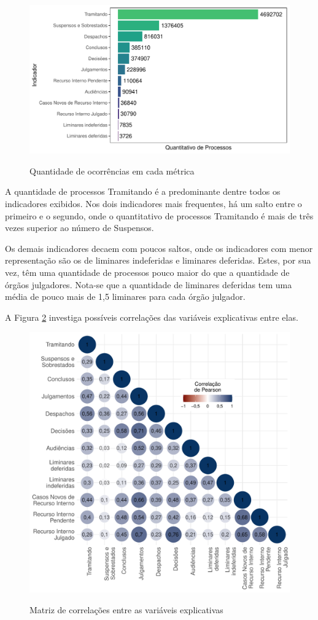 \begin{figure}[H]
    \centering
    \caption{Quantidade de ocorrências em cada métrica}
    \includegraphics[scale=.9]{imagens/inds_qtd.pdf}
    \label{fig:inds_qtd}
\end{figure}

A quantidade de processos Tramitando é a predominante dentre todos os indicadores exibidos. Nos dois indicadores mais frequentes, há um salto entre o primeiro e o segundo, onde o quantitativo de processos Tramitando é mais de três vezes superior ao número de Suspensos.

Os demais indicadores decaem com poucos saltos, onde os indicadores com menor representação são os de liminares indeferidas e liminares deferidas. Estes, por sua vez, têm uma quantidade de processos pouco maior do que a quantidade de órgãos julgadores. Nota-se que a quantidade de liminares deferidas tem uma média de pouco mais de 1,5 liminares para cada órgão julgador.


A Figura \ref{fig:corr_matrix} investiga possíveis correlações das variáveis explicativas entre elas. 
\begin{figure}[H]
    \centering
    \caption{Matriz de correlações entre as variáveis explicativas}
    \includegraphics[scale=0.8]{imagens/corrplot.pdf}
    \label{fig:corr_matrix}
\end{figure}

